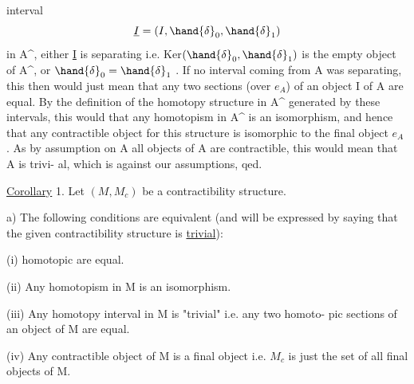 
interval
\[ \underline{I} = (I,\hand{\delta}_0,\hand{\delta}_1) \]
in A\^{}, either \underline{I} is separating i.e. Ker$(\hand{\delta}_0,\hand{\delta}_1)$ is the empty object of
A\^{}, or $\hand{\delta}_0 = \hand{\delta}_1$ . If no interval coming from A was separating, this
then would just mean that any two sections (over $e_{A\hat{}}$) of an object
I of A are equal. By the definition of the homotopy structure in A\^{}
generated by these intervals, this would  that any homotopism in
A\^{} is an isomorphism, and hence that any contractible object for this
structure is isomorphic to the final object $e_{A\hat{}}$ . As by assumption on
A all objects of A are contractible, this would mean that A is trivi-%
al, which is against our assumptions, qed.


\uline{Corollary} 1. Let $(M,M_c)$ be a contractibility structure.

a) The following conditions are equivalent (and will be expressed
by saying that the given contractibility structure is \uline{trivial}):

(i)  homotopic are equal.

(ii) Any homotopism in M is an isomorphism.

(iii) Any homotopy interval in M is "trivial" i.e. any two homoto-%
pic sections of an object of M are equal.

(iv) Any contractible object of M is a final object i.e. $M_c$ is
just the set of all final objects of M.

